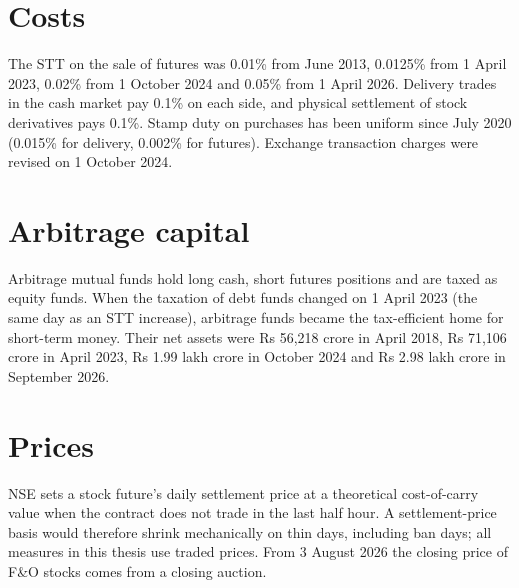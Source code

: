 \section{Costs}
The STT on the sale of futures was 0.01\% from June 2013, 0.0125\% from 1 April 2023, 0.02\% from 1 October 2024 and
0.05\% from 1 April 2026. Delivery trades in the cash market pay 0.1\% on each side, and physical settlement of stock
derivatives pays 0.1\%. Stamp duty on purchases has been uniform since July 2020 (0.015\% for delivery, 0.002\% for futures).
Exchange transaction charges were revised on 1 October 2024.

\section{Arbitrage capital}
Arbitrage mutual funds hold long cash, short futures positions and are taxed as equity funds. When the taxation of debt
funds changed on 1 April 2023 (the same day as an STT increase), arbitrage funds became the tax-efficient home for
short-term money. Their net assets were Rs 56,218 crore in April 2018, Rs 71,106 crore in April 2023, Rs 1.99 lakh crore in
October 2024 and Rs 2.98 lakh crore in September 2026.


\section{Prices}
NSE sets a stock future's daily settlement price at a theoretical cost-of-carry value when the contract does not trade in
the last half hour. A settlement-price basis would therefore shrink mechanically on thin days, including ban days; all
measures in this thesis use traded prices. From 3 August 2026 the closing price of F\&O stocks comes from a closing
auction.
